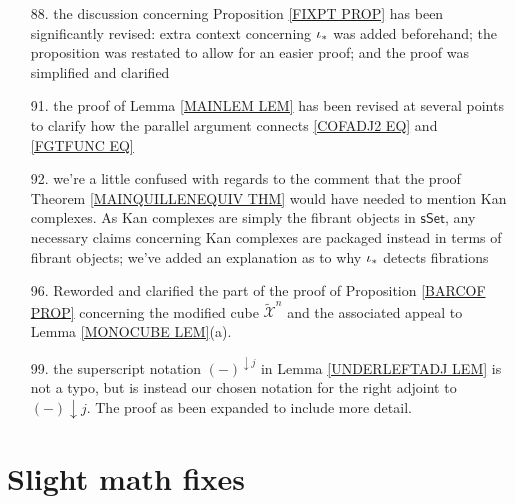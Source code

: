 \documentclass{article}
\begin{document}
\begin{itemize}
	\item[88.] the discussion concerning Proposition \ref{FIXPT PROP} has been significantly revised: 
	extra context concerning $\iota_{\**}$ was added beforehand; the proposition was restated to allow for an easier proof; and the proof was simplified and clarified
	
	\item[91.] the proof of Lemma \ref{MAINLEM LEM} has been revised at several points to clarify how the parallel argument connects
	\eqref{COFADJ2 EQ} and \eqref{FGTFUNC EQ}
	
	\item[92.] we're a little confused with regards to the comment that the proof Theorem \ref{MAINQUILLENEQUIV THM}
	would have needed to mention Kan complexes. As Kan complexes are simply the fibrant objects in $\mathsf{sSet}$,
	any necessary claims concerning Kan complexes
	are packaged instead in terms of fibrant objects;
	we've added an explanation as to why
	$\iota_{\**}$ detects fibrations
	
	\item[96.] Reworded and clarified the part of the proof of 
	Proposition \ref{BARCOF PROP}
	concerning the modified cube 
	$\tilde{\mathcal{X}}^n$
	and the associated appeal to 
	Lemma \ref{MONOCUBE LEM}(a).
	
	\item[99.] the superscript notation $(-)^{\downarrow j}$
	in Lemma \ref{UNDERLEFTADJ LEM}
	is not a typo, but is instead our chosen notation for the right adjoint to $(-)\downarrow j$.
	The proof as been expanded to include more detail.
\end{itemize} 

\section{Slight math fixes}
\end{document}

